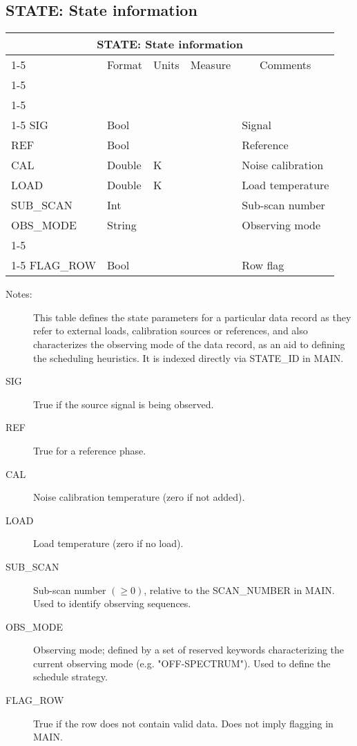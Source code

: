 \documentclass{article}
\newcommand{\defline}[1]{\cline{1-5}
\multicolumn{5}{|l|}{#1} \\
\cline{1-5}}
\newcommand{\definetable}[2]
{
	\vfill\newpage
	\subsection{#1}
        \vspace{0.15in}
        \small
	\begin{tabular}{|l|p{1.25in}|l|p{.9in}|p{1.4in}|}
	\hline
	\multicolumn{5}{|c|}{\bf #1}\\ 
	\cline{1-5}
        \multicolumn{1}{|c|}{Name}&\multicolumn{1}{|c|}{Format}&
        \multicolumn{1}{|c|}{Units}&\multicolumn{1}{|c|}{Measure}&
        \multicolumn{1}{|c|}{Comments}\\
        \cline{1-5}
        #2
        \hline
	\end{tabular}
}
\begin{document}
\definetable{STATE: State information}{
\defline{\bf Columns}
\defline{\em Data}  
SIG   &     Bool  &           &        & Signal \\
REF   &     Bool  &           &        & Reference \\
CAL   &     Double &   K      &        & Noise calibration \\
LOAD  &     Double &   K      &        & Load temperature\\
SUB\_SCAN &  Int   &          &        & Sub-scan number\\
OBS\_MODE &  String &         &        & Observing mode\\
\defline{\em Flags}
FLAG\_ROW & Bool &            &        & Row flag\\
}
\begin{description}

\item[Notes:] This table defines the state parameters for a particular
data record as they refer to external loads, calibration sources or
references, and also characterizes the observing mode of the data
record, as an aid to defining the scheduling heuristics. It is indexed
directly via STATE\_ID in MAIN.

\item[SIG] True if the source signal is being observed.

\item[REF] True for a reference phase.

\item[CAL] Noise calibration temperature (zero if not added).

\item[LOAD] Load temperature (zero if no load).

\item[SUB\_SCAN] Sub-scan number $(\geq 0)$, relative to the
SCAN\_NUMBER in MAIN. Used to identify observing sequences.

\item[OBS\_MODE] Observing mode; defined by a set of reserved keywords
characterizing the current observing mode (e.g. "OFF-SPECTRUM"). Used
to define the schedule strategy.

\item[FLAG\_ROW] True if the row does not contain valid data. Does not
imply flagging in MAIN.

\end{description}
\end{document}
